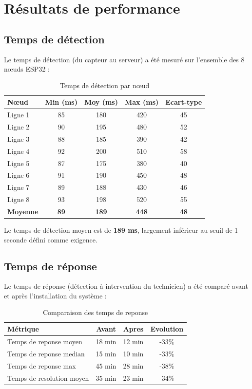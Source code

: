 \section{R\'esultats de performance}

\subsection{Temps de d\'etection}

Le temps de d\'etection (du capteur au serveur) a \'et\'e mesur\'e sur l'ensemble des 8 n\oe{}uds ESP32 :

\begin{table}[htbp]
\centering
\renewcommand{\arraystretch}{1.3}
\begin{tabular}{l c c c c}
\toprule
\textbf{N\oe{}ud} & \textbf{Min (ms)} & \textbf{Moy (ms)} & \textbf{Max (ms)} & \textbf{Ecart-type} \\
\midrule
Ligne 1 & 85 & 180 & 420 & 45 \\
Ligne 2 & 90 & 195 & 480 & 52 \\
Ligne 3 & 88 & 185 & 390 & 42 \\
Ligne 4 & 92 & 200 & 510 & 58 \\
Ligne 5 & 87 & 175 & 380 & 40 \\
Ligne 6 & 91 & 190 & 450 & 48 \\
Ligne 7 & 89 & 188 & 430 & 46 \\
Ligne 8 & 93 & 198 & 520 & 55 \\
\midrule
\textbf{Moyenne} & \textbf{89} & \textbf{189} & \textbf{448} & \textbf{48} \\
\bottomrule
\end{tabular}
\caption{Temps de d\'etection par n\oe{}ud}
\label{tab:temps_detection}
\end{table}

Le temps de d\'etection moyen est de \textbf{189 ms}, largement inf\'erieur au seuil de 1 seconde d\'efini comme exigence.

\subsection{Temps de r\'eponse}

Le temps de r\'eponse (d\'etection \`a intervention du technicien) a \'et\'e compar\'e avant et apr\`es l'installation du syst\`eme :

\begin{table}[htbp]
\centering
\renewcommand{\arraystretch}{1.3}
\begin{tabular}{l c c c}
\toprule
\textbf{M\'etrique} & \textbf{Avant} & \textbf{Apres} & \textbf{Evolution} \\
\midrule
Temps de reponse moyen & 18 min & 12 min & -33\% \\
Temps de reponse median & 15 min & 10 min & -33\% \\
Temps de reponse max & 45 min & 28 min & -38\% \\
Temps de resolution moyen & 35 min & 23 min & -34\% \\
\bottomrule
\end{tabular}
\caption{Comparaison des temps de reponse}
\label{tab:temps_reponse}
\end{table}


